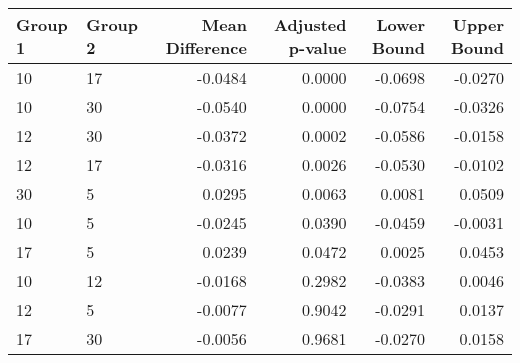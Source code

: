 \begin{tabular}{llrrrr}
\toprule
Group 1 & Group 2 & Mean Difference & Adjusted p-value & Lower Bound & Upper Bound \\
\midrule
10 & 17 & -0.0484 & 0.0000 & -0.0698 & -0.0270 \\
10 & 30 & -0.0540 & 0.0000 & -0.0754 & -0.0326 \\
12 & 30 & -0.0372 & 0.0002 & -0.0586 & -0.0158 \\
12 & 17 & -0.0316 & 0.0026 & -0.0530 & -0.0102 \\
30 & 5 & 0.0295 & 0.0063 & 0.0081 & 0.0509 \\
10 & 5 & -0.0245 & 0.0390 & -0.0459 & -0.0031 \\
17 & 5 & 0.0239 & 0.0472 & 0.0025 & 0.0453 \\
10 & 12 & -0.0168 & 0.2982 & -0.0383 & 0.0046 \\
12 & 5 & -0.0077 & 0.9042 & -0.0291 & 0.0137 \\
17 & 30 & -0.0056 & 0.9681 & -0.0270 & 0.0158 \\
\bottomrule
\end{tabular}
